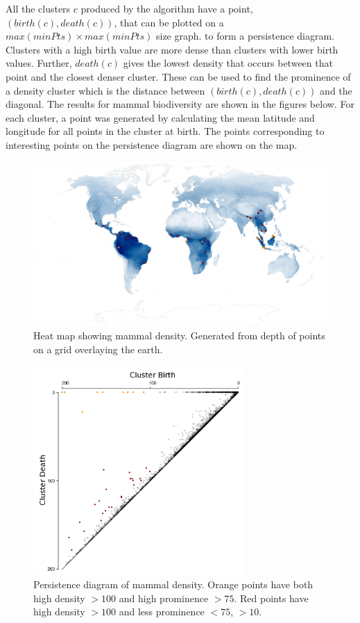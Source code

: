 \documentclass[11pt, fullpage,letterpaper]{article}
\begin{document}
		All the clusters $c$ produced by the algorithm have a point, $(birth(c), death(c))$, that can be plotted on a $max(minPts) \times max(minPts)$ size graph.  to form a persistence diagram. Clusters with a high birth value are more dense than clusters with lower birth values. Further, $death(c)$ gives the lowest density that occurs between that point and the closest denser cluster. These can be used to find the prominence of a density cluster which is the distance between $(birth(c), death(c))$ and the diagonal. The results for mammal biodiversity are shown in the figures below. For each cluster, a point was generated by calculating the mean latitude and longitude for all points in the cluster at birth. The points corresponding to interesting points on the persistence diagram are shown on the map.
		
		\begin{figure}[H]
			\centering
			\includegraphics[width=17cm]{map.png}
			\caption{Heat map showing mammal density. Generated from depth of points on a grid overlaying the earth.}
		\end{figure}
		
		\begin{figure}[H]
			\centering
			\includegraphics[width=8cm]{graph.png}
			\caption{Persistence diagram of mammal density. Orange points have both high density $>100$ and high prominence $>75$. Red points have high density $>100$ and less prominence $<75$, $>10$.}
		\end{figure}
		
\end{document}

